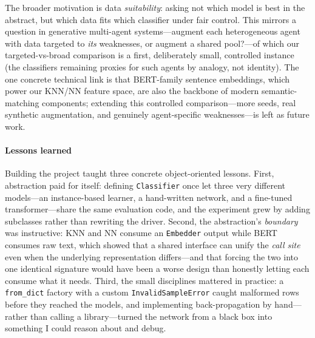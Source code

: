 \documentclass[conference]{IEEEtran}
\begin{document}
The broader motivation is data \emph{suitability}: asking not which
model is best in the abstract, but which data fits which classifier
under fair control. This mirrors a question in generative multi-agent
systems---augment each heterogeneous agent with data targeted to
\emph{its} weaknesses, or augment a shared pool?---of which our
targeted-vs-broad comparison is a first, deliberately small, controlled
instance (the classifiers remaining proxies for such agents by analogy,
not identity). The one concrete technical link is that BERT-family
sentence embeddings, which power our KNN/NN feature space, are also the
backbone of modern semantic-matching components; extending this
controlled comparison---more seeds, real synthetic augmentation, and
genuinely agent-specific weaknesses---is left as future work.

\paragraph*{Lessons learned}
Building the project taught three concrete object-oriented lessons.
First, abstraction paid for itself: defining \texttt{Classifier} once let
three very different models---an instance-based learner, a hand-written
network, and a fine-tuned transformer---share the same evaluation code,
and the experiment grew by adding subclasses rather than rewriting the
driver. Second, the abstraction's \emph{boundary} was instructive: KNN
and NN consume an \texttt{Embedder} output while BERT consumes raw text,
which showed that a shared interface can unify the \emph{call site} even
when the underlying representation differs---and that forcing the two
into one identical signature would have been a worse design than honestly
letting each consume what it needs. Third, the small disciplines mattered
in practice: a \texttt{from\_dict} factory with a custom
\texttt{InvalidSampleError} caught malformed rows before they reached the
models, and implementing back-propagation by hand---rather than calling a
library---turned the network from a black box into something I could
reason about and debug.



\end{document}

